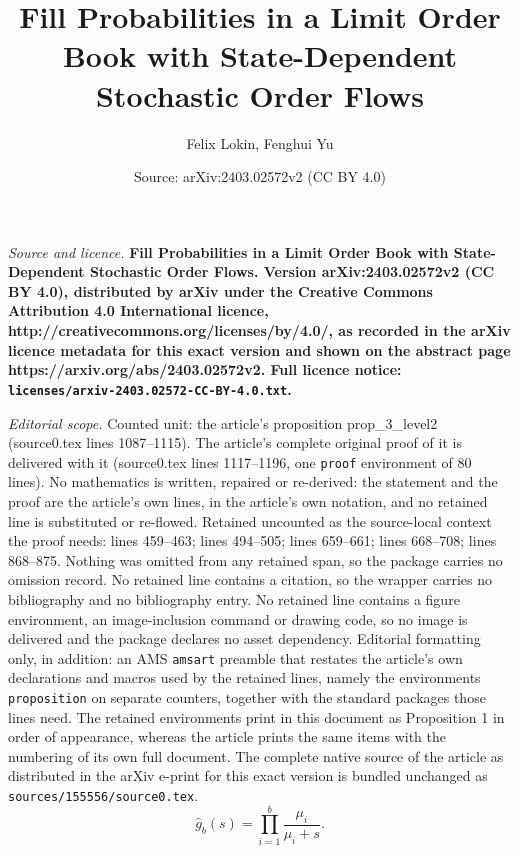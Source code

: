 \documentclass[10pt,a4paper]{amsart}
\title{\bf Fill Probabilities in a Limit Order Book with State-Dependent Stochastic Order Flows}
\author{Felix Lokin, Fenghui Yu}
\date{Source: arXiv:2403.02572v2 (CC BY 4.0)}
\begin{document}
\maketitle

\noindent\emph{Source and licence.} \bf Fill Probabilities in a Limit Order Book with State-Dependent Stochastic Order Flows. Version arXiv:2403.02572v2 (CC BY 4.0), distributed by arXiv under the Creative Commons Attribution 4.0 International licence, http://creativecommons.org/licenses/by/4.0/, as recorded in the arXiv licence metadata for this exact version and shown on the abstract page https://arxiv.org/abs/2403.02572v2. Full licence notice: \texttt{licenses/arxiv-2403.02572-CC-BY-4.0.txt}.\par\smallskip

\noindent\textit{Editorial scope.} Counted unit: the article's proposition prop\_3\_level2 (source0.tex lines 1087--1115). The article's complete original proof of it is delivered with it (source0.tex lines 1117--1196, one \texttt{proof} environment of 80 lines). No mathematics is written, repaired or re-derived: the statement and the proof are the article's own lines, in the article's own notation, and no retained line is substituted or re-flowed.  Retained uncounted as the source-local context the proof needs: lines 459--463; lines 494--505; lines 659--661; lines 668--708; lines 868--875.  Nothing was omitted from any retained span, so the package carries no omission record.  No retained line contains a citation, so the wrapper carries no bibliography and no bibliography entry.  No retained line contains a figure environment, an image-inclusion command or drawing code, so no image is delivered and the package declares no asset dependency.  Editorial formatting only, in addition: an AMS \texttt{amsart} preamble that restates the article's own declarations and macros used by the retained lines, namely the environments \texttt{proposition} on separate counters, together with the standard packages those lines need.  The retained environments print in this document as Proposition 1 in order of appearance, whereas the article prints the same items with the numbering of its own full document.  The complete native source of the article as distributed in the arXiv e-print for this exact version is bundled unchanged as \texttt{sources/155556/source0.tex}.
\begin{equation}\label{productdeath}
\hat{g}_b(s)
=
\prod_{i=1}^b \frac{\mu_i}{\mu_i+s}.
\end{equation}
\end{document}
